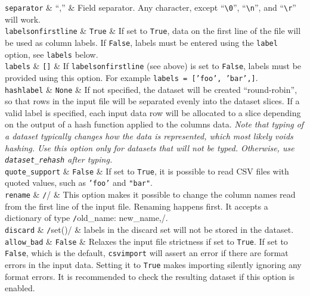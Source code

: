   \RP \texttt{separator} & ``,'' & Field separator.  Any character, except
  ``\verb$\0$'', ``\verb$\n$'', and ``\verb$\r$'' will work.\\

  
  \RP \texttt{labelsonfirstline} & \texttt{True} & If set to
  \texttt{True}, data on the first line of the file will be used as
  column labels.  If \texttt{False}, labels must be entered using the
  \texttt{label} option, see \texttt{labels} below.\\

  \RP \texttt{labels} & \texttt{[]} & If \texttt{labelsonfirstline} (see
  above) is set to \texttt{False}, labels must be provided using this
  option.  For example \texttt{labels = ['foo', 'bar',]}.\\

  \RP \texttt{hashlabel} & \texttt{None} & If not specified, the dataset
  will be created ``round-robin'', so that rows in the input file will
  be separated evenly into the dataset slices.  If a valid label is
  specified, each input data row will be allocated to a slice
  depending on the output of a hash function applied to the columns
  data.  \textsl{Note that typing of a dataset typically changes how
    the data is represented, which most likely voids hashing.  Use
    this option only for datasets that will not be typed.  Otherwise,
    use \texttt{dataset\_rehash} after typing.}\\

  \RP \texttt{quote\_support} & \texttt{False} & If set to \texttt{True},
  it is possible to read CSV files with quoted values, such as
  \texttt{'foo'} and \texttt{"bar"}.\\

  \RP \texttt{rename} & \texttt/{}/ & This option makes it possible to
  change the column names read from the first line of the input file.
  Renaming happens first.  It accepts a dictionary of type
  \texttt/{old_name: new_name,}/.\\

  \RP \texttt{discard} & \texttt/set()/ & labels in the discard set will
  not be stored in the dataset.\\
  
  \RP \texttt{allow\_bad} & \texttt{False} & Relaxes the input file
  strictness if set to \texttt{True}.  If set to \texttt{False}, which
  is the default, \texttt{csvimport} will assert an error if there are
  format errors in the input data.  Setting it to \texttt{True} makes
  importing silently ignoring any format errors.  It is recommended to
  check the resulting dataset if this option is enabled.\\
\stoptable

